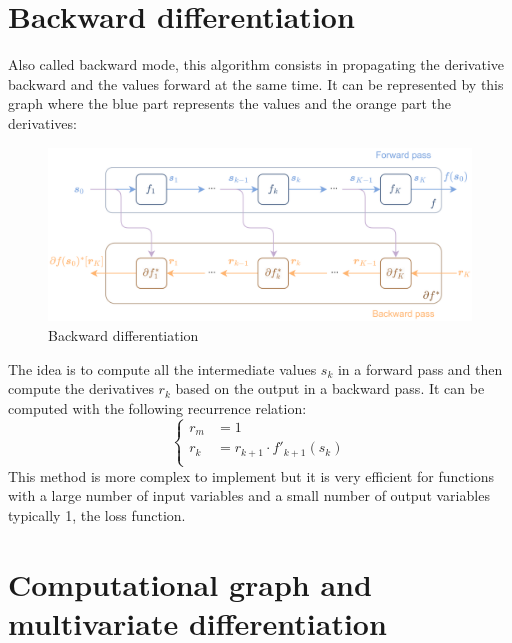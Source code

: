 \documentclass[12pt, openany]{report}
\theoremstyle{definition}
\begin{document}
\section{Backward differentiation}
Also called backward mode, this algorithm consists in propagating the derivative backward and the values forward at the same time. It can be represented by this graph where the blue part represents the values and the orange part the derivatives:
\begin{figure}[H]
    \centering
    \includegraphics[width=\textwidth]{img/backward_diff.png}
    \caption{Backward differentiation}
    \label{fig:backward_diff}
\end{figure}
The idea is to compute all the intermediate values $s_k$ in a forward pass and then compute the derivatives $r_k$ based on the output in a backward pass. It can be computed with the following recurrence relation:
\begin{equation}
  \begin{cases}
    r_m &= 1 \\
    r_k &= r_{k+1} \cdot f'_{k+1}(s_{k})\\
  \end{cases}
\end{equation}
This method is more complex to implement but it is very efficient for functions with a large number of input variables and a small number of output variables typically 1, the loss function.
\section{Computational graph and multivariate differentiation}
\end{document}
